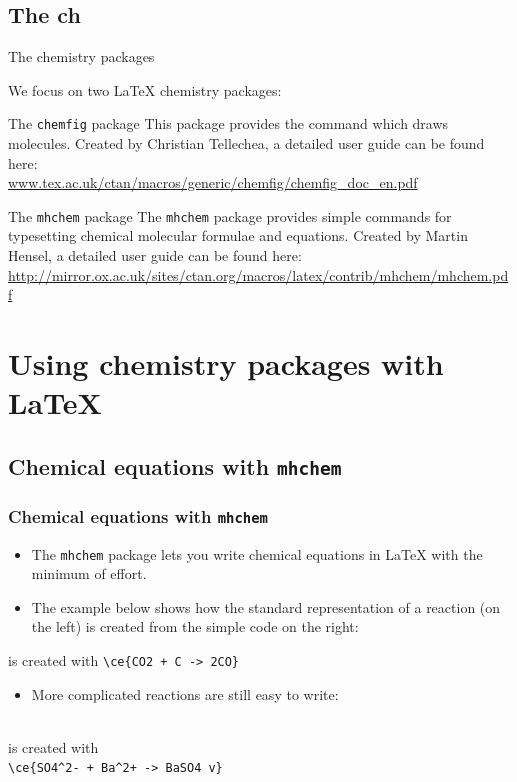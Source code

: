 \documentclass{beamer}
\begin{document}
\subsection{The ch}
\begin{frame}{The chemistry packages}

We focus on two \LaTeX{} chemistry packages:
\begin{block}{The \texttt{chemfig} package}
This package provides the command which draws molecules. Created by Christian Tellechea, a detailed user guide can be found here:\\[0.4cm]
\small{\url{www.tex.ac.uk/ctan/macros/generic/chemfig/chemfig_doc_en.pdf}}
\end{block}
\begin{block}{The \texttt{mhchem} package}
The \texttt{mhchem} package provides simple commands for typesetting chemical molecular formulae and equations. Created by Martin Hensel, a detailed user guide can be found here:\\[0.4cm]
\small{\url{http://mirror.ox.ac.uk/sites/ctan.org/macros/latex/contrib/mhchem/mhchem.pdf}}
\end{block}

\end{frame}

\section{Using chemistry packages with \LaTeX{}}

\subsection{Chemical equations with \texttt{mhchem}}

\begin{frame}[fragile]
\frametitle{Chemical equations with \texttt{mhchem}}

\begin{itemize}
\item The \texttt{mhchem} package lets you write chemical equations in \LaTeX{} with the minimum of effort. 
\item The example below shows how the standard representation of a reaction (on the left) is created from the simple code on the right:
\end{itemize}

\begin{center}
 is created with \verb|\ce{CO2 + C -> 2CO}|
\end{center}

\begin{itemize}
\item More complicated reactions are still easy to write:
\end{itemize}

\begin{center}
\\[0.1cm]
is created with\\[0.1cm]
\verb|\ce{SO4^2- + Ba^2+ -> BaSO4 v}|
\end{center}

\end{frame}
\end{document}
